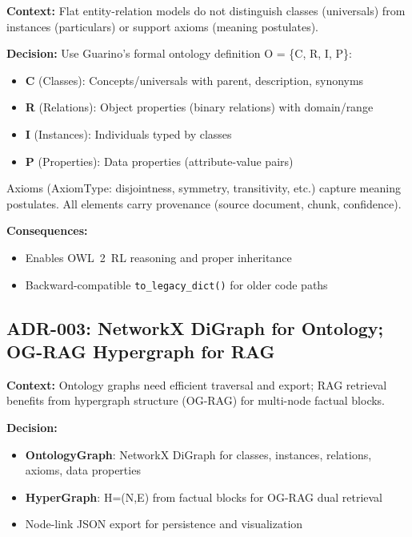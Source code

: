 \documentclass[11pt,a4paper]{article}
\begin{document}
\textbf{Context:} Flat entity-relation models do not distinguish classes (universals) from instances (particulars) or support axioms (meaning postulates).

\textbf{Decision:} Use Guarino's formal ontology definition O = \{C, R, I, P\}:
\begin{itemize}
    \item \textbf{C} (Classes): Concepts/universals with parent, description, synonyms
    \item \textbf{R} (Relations): Object properties (binary relations) with domain/range
    \item \textbf{I} (Instances): Individuals typed by classes
    \item \textbf{P} (Properties): Data properties (attribute-value pairs)
\end{itemize}

Axioms (AxiomType: disjointness, symmetry, transitivity, etc.) capture meaning postulates. All elements carry provenance (source document, chunk, confidence).

\textbf{Consequences:}
\begin{itemize}
    \item Enables OWL~2~RL reasoning and proper inheritance
    \item Backward-compatible \texttt{to\_legacy\_dict()} for older code paths
\end{itemize}

\subsection{ADR-003: NetworkX DiGraph for Ontology; OG-RAG Hypergraph for RAG}
\label{sec:adr-graph}

\textbf{Context:} Ontology graphs need efficient traversal and export; RAG retrieval benefits from hypergraph structure (OG-RAG) for multi-node factual blocks.

\textbf{Decision:}
\begin{itemize}
    \item \textbf{OntologyGraph}: NetworkX DiGraph for classes, instances, relations, axioms, data properties
    \item \textbf{HyperGraph}: H=(N,E) from factual blocks for OG-RAG dual retrieval
    \item Node-link JSON export for persistence and visualization
\end{itemize}
\end{document}
